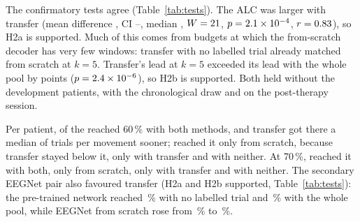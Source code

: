 The confirmatory tests agree (Table~\ref{tab:tests}). The ALC was larger with
transfer (mean difference \rqTwoHTwoADiff, CI
\rqTwoHTwoADiffCiLo--\rqTwoHTwoADiffCiHi, median \rqTwoHTwoAMedianDiff,
$W = 21$, $p = 2.1\times10^{-4}$, $r = 0.83$), so H2a is
supported. Much of this comes from budgets at which the from-scratch decoder
has very few windows: transfer with no labelled trial already matched from
scratch at $k = 5$. Transfer's lead at $k = 5$ exceeded its lead with the
whole pool by \rqTwoHTwoBPointsDiff{} points ($p = 2.4\times10^{-6}$), so H2b is
supported. Both held without the development patients, with the
chronological draw and on the post-therapy session.

Per patient, \rqTwoReachRestAhSfSixtyBoth{} of the \rqTwoHTwoAN{} reached
60\,\% with both methods, and transfer got there a median of
\rqTwoReachRestAhSfSixtyMedianSaved{} trials per movement sooner;
\rqTwoReachRestAhSfSixtyOnlyScratch{} reached it only from scratch, because
transfer stayed below it, \rqTwoReachRestAhSfSixtyOnlyTransfer{} only with
transfer and \rqTwoReachRestAhSfSixtyNeither{} with neither. At 70\,\%,
\rqTwoReachRestAhSfSeventyBoth{} reached it with both,
\rqTwoReachRestAhSfSeventyOnlyScratch{} only from scratch,
\rqTwoReachRestAhSfSeventyOnlyTransfer{} only with transfer and
\rqTwoReachRestAhSfSeventyNeither{} with neither.
The secondary EEGNet pair also favoured transfer (H2a and H2b supported,
Table~\ref{tab:tests}): the pre-trained network reached
\rqTwoRestAhSfEegnetEaFtKZeroMean\,\% with no labelled trial and
\rqTwoRestAhSfEegnetEaFtKAllMean\,\% with the whole pool, while EEGNet from
scratch rose from \rqTwoRestAhSfEegnetScratchKOneMean\,\% to
\rqTwoRestAhSfEegnetScratchKAllMean\,\%.

